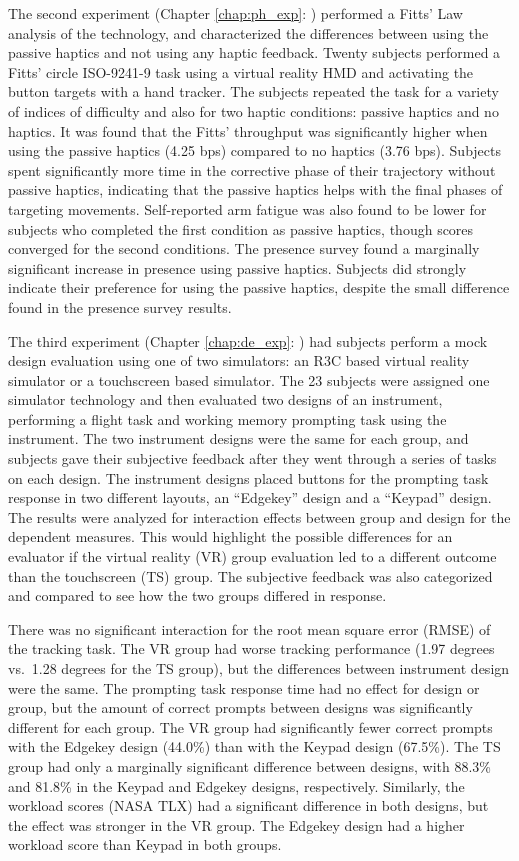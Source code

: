 The second experiment (Chapter \ref{chap:ph_exp}: ) performed a Fitts' Law analysis of the technology, and characterized the differences between using the passive haptics and not using any haptic feedback.
Twenty subjects performed a Fitts' circle ISO-9241-9 task using a virtual reality HMD and activating the button targets with a hand tracker.
The subjects repeated the task for a variety of indices of difficulty and also for two haptic conditions: passive haptics and no haptics.
It was found that the Fitts' throughput was significantly higher when using the passive haptics (4.25 bps) compared to no haptics (3.76 bps).
Subjects spent significantly more time in the corrective phase of their trajectory without passive haptics, indicating that the passive haptics helps with the final phases of targeting movements.
Self-reported arm fatigue was also found to be lower for subjects who completed the first condition as passive haptics, though scores converged for the second conditions.
The presence survey found a marginally significant increase in presence using passive haptics.
Subjects did strongly indicate their preference for using the passive haptics, despite the small difference found in the presence survey results.

The third experiment (Chapter \ref{chap:de_exp}: ) had subjects perform a mock design evaluation using one of two simulators: an R3C based virtual reality simulator or a touchscreen based simulator.
The 23 subjects were assigned one simulator technology and then evaluated two designs of an instrument, performing a flight task and working memory prompting task using the instrument.
The two instrument designs were the same for each group, and subjects gave their subjective feedback after they went through a series of tasks on each design.
The instrument designs placed buttons for the prompting task response in two different layouts, an ``Edgekey'' design and a ``Keypad'' design.
The results were analyzed for interaction effects between group and design for the dependent measures.
This would highlight the possible differences for an evaluator if the virtual reality (VR) group evaluation led to a different outcome than the touchscreen (TS) group.
The subjective feedback was also categorized and compared to see how the two groups differed in response.

There was no significant interaction for the root mean square error (RMSE) of the tracking task.
The VR group had worse tracking performance (1.97 degrees vs.\ 1.28 degrees for the TS group), but the differences between instrument design were the same.
The prompting task response time had no effect for design or group, but the amount of correct prompts between designs was significantly different for each group.
The VR group had significantly fewer correct prompts with the Edgekey design (44.0\%) than with the Keypad design (67.5\%).
The TS group had only a marginally significant difference between designs, with 88.3\% and 81.8\% in the Keypad and Edgekey designs, respectively.
Similarly, the workload scores (NASA TLX) had a significant difference in both designs, but the effect was stronger in the VR group.
The Edgekey design had a higher workload score than Keypad in both groups.

